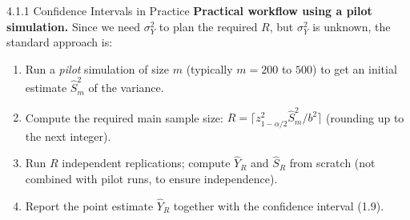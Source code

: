 \documentclass[aspectratio=169,10pt]{beamer}
\begin{document}
\begin{frame}[allowframebreaks]{4.1.1 Confidence Intervals in Practice}
\textbf{Practical workflow using a pilot simulation.}
Since we need $\sigma_Y^2$ to plan the required $R$, but $\sigma_Y^2$
is unknown, the standard approach is:
\begin{enumerate}
  \item Run a \emph{pilot} simulation of size $m$ (typically $m = 200$
        to $500$) to get an initial estimate $\hat{S}_m^2$ of the variance.
  \item Compute the required main sample size:
        $R = \lceil z_{1-\alpha/2}^2 \hat{S}_m^2/b^2 \rceil$
        (rounding up to the next integer).
  \item Run $R$ independent replications; compute $\hat{Y}_R$ and
        $\hat{S}_R$ from scratch (not combined with pilot runs, to ensure
        independence).
  \item Report the point estimate $\hat{Y}_R$ together with the
        confidence interval (1.9).
\end{enumerate}

\end{frame}
\end{document}
